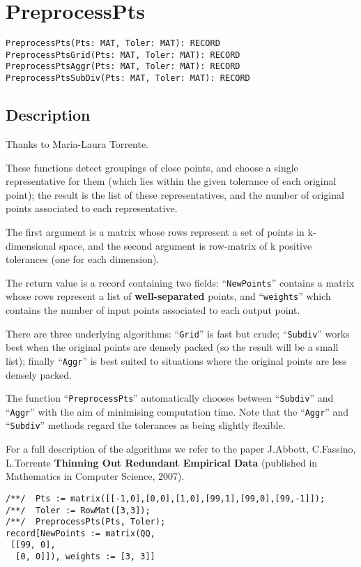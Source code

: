 \documentclass[a4paper]{mybook}
\newenvironment{command}{}{} %
\begin{document}
\section{PreprocessPts}
\label{PreprocessPts}
\begin{command} %


\begin{Verbatim}[label=syntax, rulecolor=\color{MidnightBlue},
frame=single]
PreprocessPts(Pts: MAT, Toler: MAT): RECORD
PreprocessPtsGrid(Pts: MAT, Toler: MAT): RECORD
PreprocessPtsAggr(Pts: MAT, Toler: MAT): RECORD
PreprocessPtsSubDiv(Pts: MAT, Toler: MAT): RECORD
\end{Verbatim}


\subsection*{Description}

Thanks to Maria-Laura Torrente.
\par 
These functions detect groupings of close points, and choose a single
representative for them (which lies within the given tolerance of each
original point); the result is the list of these representatives, and
the number of original points associated to each representative.
\par 
The first argument is a matrix whose rows represent a set of points in
k-dimensional space, and the second argument is row-matrix of k positive
tolerances (one for each dimension).
\par 
The return value is a record containing two fields: ``\verb&NewPoints&'' contains
a matrix whose rows represent a list of \textbf{well-separated} points, and
``\verb&weights&'' which contains the number of input points associated to each
output point.
\par 
There are three underlying algorithms: ``\verb&Grid&'' is fast but crude;
``\verb&Subdiv&'' works best when the original points are densely packed
(so the result will be a small list); finally ``\verb&Aggr&'' is best
suited to situations where the original points are less densely packed.
\par 
The function ``\verb&PreprocessPts&'' automatically chooses between ``\verb&Subdiv&''
and ``\verb&Aggr&'' with the aim of minimising computation time.  Note that the
``\verb&Aggr&'' and ``\verb&Subdiv&'' methods regard the tolerances as being slightly
flexible.
\par 
For a full description of the algorithms we refer to the paper
J.Abbott, C.Fassino, L.Torrente
\textbf{Thinning Out Redundant Empirical Data} (published in
Mathematics in Computer Science, 2007).
\begin{Verbatim}[label=example, rulecolor=\color{PineGreen}, frame=single]
/**/  Pts := matrix([[-1,0],[0,0],[1,0],[99,1],[99,0],[99,-1]]);
/**/  Toler := RowMat([3,3]);
/**/  PreprocessPts(Pts, Toler);
record[NewPoints := matrix(QQ,
 [[99, 0],
  [0, 0]]), weights := [3, 3]]


\end{Verbatim}
\end{command}
\end{document}
